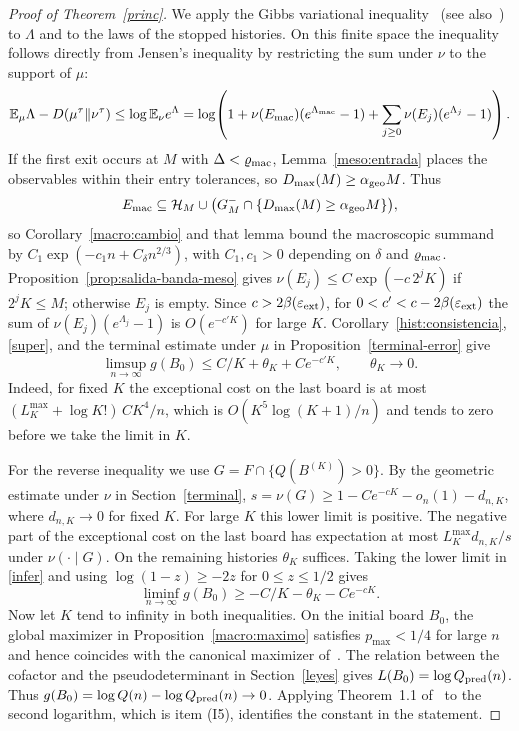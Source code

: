 \begin{proof}[Proof of Theorem~\ref{princ}]
We apply the Gibbs variational inequality~\cite[Proposition~1.4.2]{de} (see
also~\cite[Ch.~2]{ct}) to $\Lambda$ and to the laws of the stopped
histories. On this finite space the inequality follows directly from Jensen's inequality by
restricting the sum under $\nu$ to the support of $\mu$:
\[
 \mathbb{E}_\mu\Lambda-D(\mu^\tau\Vert\nu^\tau)\le\log\mathbb{E}_\nu e^\Lambda
 =\log\!\left(1+\nu(E_{\rm mac})(e^{\Lambda_{\rm mac}}-1)
              +\sum_{j\ge0}\nu(E_j)(e^{\Lambda_j}-1)\right).
\]
If the first exit occurs at $M$ with $\Delta<\varrho_{\rm mac}$, Lemma~\ref{meso:entrada} places
the observables within their entry tolerances, so $D_{\max}(M)\ge\alpha_{\rm geo} M$. Thus
\[
 E_{\rm mac}\subseteq\mathcal H_M\cup\bigl(G_M^-\cap\{D_{\max}(M)\ge\alpha_{\rm geo} M\}\bigr),
\]
so Corollary~\ref{macro:cambio} and that lemma bound the macroscopic summand by
${C_1\exp(-c_1n+C_\delta n^{2/3})}$, with $C_1,c_1>0$ depending on $\delta$ and $\varrho_{\rm mac}$.
Proposition~\ref{prop:salida-banda-meso} gives ${\nu(E_j)\le C\exp(-c\,2^jK)}$ if $2^jK\le M$;
otherwise $E_j$ is empty. Since $c>2\beta(\varepsilon_{\rm ext})$, for
$0<c'<c-2\beta(\varepsilon_{\rm ext})$ the sum of $\nu(E_j)(e^{\Lambda_j}-1)$ is $O(e^{-c'K})$ for
large $K$. Corollary~\ref{hist:consistencia}, \eqref{super}, and the terminal estimate
under $\mu$ in Proposition~\ref{terminal-error} give
\[
 \limsup_{n\to\infty}g(B_0)\le C/K+\theta_K+Ce^{-c'K},\qquad\theta_K\to0 .
\]
Indeed, for fixed $K$ the exceptional cost on the last board is at most
${(L_K^{\max}+\log K!)\,CK^4/n}$, which is ${O(K^5\log(K+1)/n)}$ and tends to zero before we take
the limit in $K$.

For the reverse inequality we use $G=F\cap\{Q(B^{(K)})>0\}$. By the geometric estimate under $\nu$
in Section~\ref{terminal}, $s=\nu(G)\ge1-Ce^{-cK}-o_n(1)-d_{n,K}$, where $d_{n,K}\to0$ for fixed
$K$. For large $K$ this lower limit is positive. The negative part of the exceptional cost on the
last board has expectation at most $L_K^{\max}d_{n,K}/s$ under $\nu(\cdot\mid G)$. On the remaining
histories $\theta_K$ suffices. Taking the lower limit in \eqref{infer} and using
$\log(1-z)\ge-2z$ for $0\le z\le1/2$ gives
\[
 \liminf_{n\to\infty}g(B_0)\ge-C/K-\theta_K-Ce^{-cK}.
\]
Now let $K$ tend to infinity in both inequalities. On the initial board $B_0$, the global maximizer
in Proposition~\ref{macro:maximo} satisfies $p_{\max}<1/4$ for large $n$ and hence coincides with
the canonical maximizer of~\cite{pred}. The relation between the cofactor and the pseudodeterminant
in Section~\ref{leyes} gives $L(B_0)=\log Q_{\rm pred}(n)$. Thus
$g(B_0)=\log Q(n)-\log Q_{\rm pred}(n)\to0$. Applying Theorem~1.1 of~\cite{pred} to the second
logarithm, which is item (I5), identifies the constant in the statement.
\end{proof}
